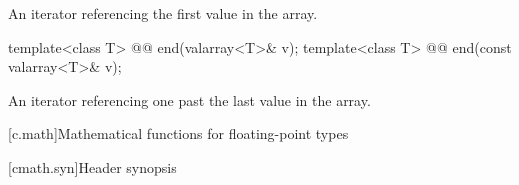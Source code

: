 \begin{itemdescr}
\pnum
\returns An iterator referencing the first value in the array.
\end{itemdescr}

%
\begin{itemdecl}
template<class T> @@ end(valarray<T>& v);
template<class T> @@ end(const valarray<T>& v);
\end{itemdecl}

\begin{itemdescr}
\pnum
\returns An iterator referencing one past the last value in the array.
\end{itemdescr}

[c.math]{Mathematical functions for floating-point types}

[cmath.syn]{Header  synopsis}

